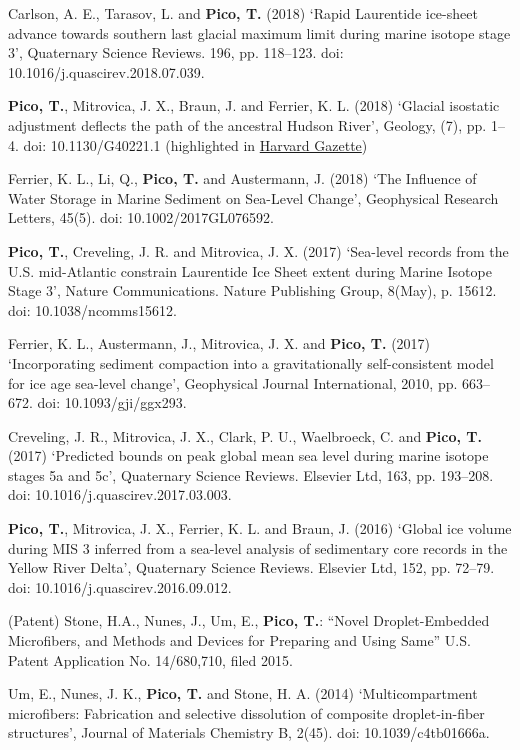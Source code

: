 \documentclass[margin,line]{res}
\begin{document}
\begin{resume}
Carlson, A. E., Tarasov, L. and {\bf Pico, T.} (2018) ‘Rapid Laurentide ice-sheet advance towards southern last glacial maximum limit during marine isotope stage 3’, Quaternary Science Reviews. 196, pp. 118–123. doi: 10.1016/j.quascirev.2018.07.039.

{\bf Pico, T.}, Mitrovica, J. X., Braun, J. and Ferrier, K. L. (2018) ‘Glacial isostatic adjustment deflects the path of the ancestral Hudson River’, Geology, (7), pp. 1–4. doi: 10.1130/G40221.1 (highlighted in \href{https://news.harvard.edu/gazette/story/2018/08/ancient-changes-along-the-hudson-offer-glimpse-into-how-ice-sheets-grew/}{Harvard Gazette})

Ferrier, K. L., Li, Q., {\bf Pico, T.} and Austermann, J. (2018) ‘The Influence of Water Storage in Marine Sediment on Sea-Level Change’, Geophysical Research Letters, 45(5). doi: 10.1002/2017GL076592.

{\bf Pico, T.}, Creveling, J. R. and Mitrovica, J. X. (2017) ‘Sea-level records from the U.S. mid-Atlantic constrain Laurentide Ice Sheet extent during Marine Isotope Stage 3’, Nature Communications. Nature Publishing Group, 8(May), p. 15612. doi: 10.1038/ncomms15612.

Ferrier, K. L., Austermann, J., Mitrovica, J. X. and {\bf Pico, T.} (2017) ‘Incorporating sediment compaction into a gravitationally self-consistent model for ice age sea-level change’, Geophysical Journal International, 2010, pp. 663–672. doi: 10.1093/gji/ggx293.

Creveling, J. R., Mitrovica, J. X., Clark, P. U., Waelbroeck, C. and {\bf Pico, T.} (2017) ‘Predicted bounds on peak global mean sea level during marine isotope stages 5a and 5c’, Quaternary Science Reviews. Elsevier Ltd, 163, pp. 193–208. doi: 10.1016/j.quascirev.2017.03.003.

{\bf Pico, T.}, Mitrovica, J. X., Ferrier, K. L. and Braun, J. (2016) ‘Global ice volume during MIS 3 inferred from a sea-level analysis of sedimentary core records in the Yellow River Delta’, Quaternary Science Reviews. Elsevier Ltd, 152, pp. 72–79. doi: 10.1016/j.quascirev.2016.09.012.

(Patent)  Stone, H.A.,  Nunes, J.,  Um, E., {\bf Pico, T.}: ``Novel Droplet-Embedded Microfibers, and Methods and Devices for Preparing and Using Same” U.S. Patent Application No. 14/680,710, filed 2015.

Um, E., Nunes, J. K., {\bf Pico, T.} and Stone, H. A. (2014) ‘Multicompartment microfibers: Fabrication and selective dissolution of composite droplet-in-fiber structures’, Journal of Materials Chemistry B, 2(45). doi: 10.1039/c4tb01666a.


\end{resume}
\end{document}
